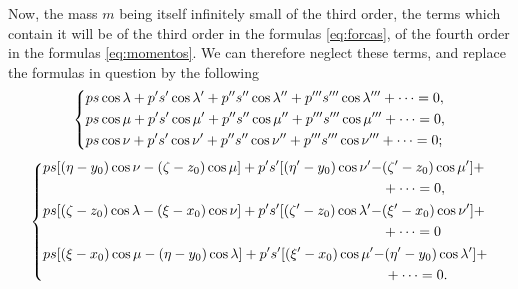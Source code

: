 \documentclass[leqno,openright,smallroyalvopaper,8pt,twoside,showtrims]{memoir}
\begin{document}
Now, the mass $m$ being itself infinitely small of the third order, the terms which contain it will be of the third order in the formulas \eqref{eq:forcas}, of the fourth order in the formulas \eqref{eq:momentos}. We can therefore neglect these terms, and replace the formulas in question by the following
\begin{equation}\label{eq:forcas2}
   \begin{dcases}
        ps\cos\lambda+p's'\cos\lambda'+p''s''\cos\lambda''+p'''s'''\cos\lambda'''+\cdots=0,\\
       ps\cos\mu+p's'\cos\mu'+p''s''\cos\mu''+p'''s'''\cos\mu'''+\cdots=0,\\
        ps\cos\nu+p's'\cos\nu'+p''s''\cos\nu''+p'''s'''\cos\nu'''+\cdots=0;
   \end{dcases}
 \end{equation}
 \begin{equation}\label{eq:momentos2}
   \begin{dcases}
   \begin{aligned}
        ps[(\eta-y_0)\cos\nu-(\zeta-z_0)\cos\mu]+p's'[(\eta'-y_0)\cos\nu'-&(\zeta'-z_0)\cos\mu']+\\
        &+\cdots=0,
   \end{aligned}\\
         \begin{aligned}
        ps[(\zeta-z_0)\cos\lambda-(\xi-x_0)\cos\nu]+p's'[(\zeta'-z_0)\cos\lambda'-&(\xi'-x_0)\cos\nu']+\\
        &+\cdots=0
   \end{aligned}\\
         \begin{aligned}
        ps[(\xi-x_0)\cos\mu-(\eta-y_0)\cos\lambda]+p's'[(\xi'-x_0)\cos\mu'-&(\eta'-y_0)\cos\lambda']+\\
        &+\cdots=0.
   \end{aligned}
   \end{dcases}
 \end{equation}
\end{document}
